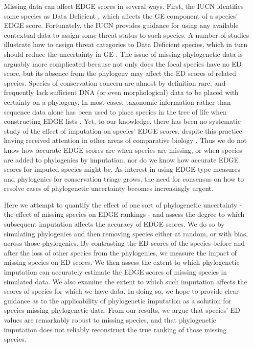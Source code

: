 \documentclass[10pt,english]{article}
\begin{document}
Missing data can affect EDGE scores in several ways. First, the IUCN identifies
some species as Data Deficient \autocite{Iucn2001, Iucn2008}, which affects the
GE component of a species' EDGE score. Fortunately, the IUCN provides guidance
for using any available contextual data to assign some threat status to such
species. A number of studies illustrate how to assign threat categories to Data
Deficient species, which in turn should reduce the uncertainty in GE
\autocite{Good2006, Butchart2010, Morais2013, Dulvy2014}. The issue of missing
phylogenetic data is arguably more complicated because not only does the focal
species have no ED score, but its absence from the phylogeny may affect the ED
scores of related species. Species of conservation concern are almost by
definition rare, and frequently lack sufficient DNA (or even morphological) data
to be placed with certainty on a phylogeny. In most cases, taxonomic information
rather than sequence data alone has been used to place species in the tree of
life when constructing EDGE lists \autocite[see][]{Isaac2007, Collen2011,
Isaac2012, Jetz2014, Curnick2015, Stein2018, Gumbs2018, Forest2018}. Yet, to our
knowledge, there has been no systematic study of the effect of imputation on
species’ EDGE scores, despite this practice having received attention in other
areas of comparative biology \autocite{Kuhn2011, Thomas2013, Rabosky2015}. Thus
we do not know how accurate EDGE scores are when species are missing, or when
species are added to phylogenies by imputation, nor do we know how accurate EDGE
scores for imputed species might be. As interest in using EDGE-type measures
and phylogenies for conservation triage grows, the need for consensus on how to
resolve cases of phylogenetic uncertainty becomes increasingly urgent. 

Here we attempt to quantify the effect of one sort of phylogenetic uncertainty
- the effect of missing species on EDGE rankings - and assess the degree to
which subsequent imputation affects the accuracy of EDGE scores. We do so by
simulating phylogenies and then removing species either at random, or with bias,
across those phylogenies. By contrasting the ED scores of the species before and
after the loss of other species from the phylogenies, we measure the impact of
missing species on ED scores. We then assess the extent to which phylogenetic
imputation can accurately estimate the EDGE scores of missing species in
simulated data. We also examine the extent to which such imputation affects the
scores of species for which we have data. In doing so, we hope to provide clear
guidance as to the applicability of phylogenetic imputation as a solution for
species missing phylogenetic data. From our results, we argue that species’ ED
values are remarkably robust to missing species, and that phylogenetic
imputation does not reliably reconstruct the true ranking of those missing
species.
\end{document}
